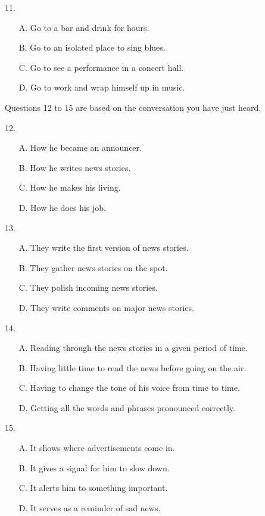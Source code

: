 \documentclass[UTF8,11pt]{ctexart}
\begin{document}
11.


\begin{itemize}[leftmargin=2em,itemsep=.2em,topsep=.4em]\item[A.] Go to a bar and drink for hours.
\item[B.] Go to an isolated place to sing blues.
\item[C.] Go to see a performance in a concert hall.
\item[D.] Go to work and wrap himself up in music.
\end{itemize}

Questions 12 to 15 are based on the conversation you have just heard.


12.


\begin{itemize}[leftmargin=2em,itemsep=.2em,topsep=.4em]\item[A.] How he became an announcer.
\item[B.] How he writes news stories.
\item[C.] How he makes his living.
\item[D.] How he does his job.
\end{itemize}

13.


\begin{itemize}[leftmargin=2em,itemsep=.2em,topsep=.4em]\item[A.] They write the first version of news stories.
\item[B.] They gather news stories on the spot.
\item[C.] They polish incoming news stories.
\item[D.] They write comments on major news stories.
\end{itemize}

14.


\begin{itemize}[leftmargin=2em,itemsep=.2em,topsep=.4em]\item[A.] Reading through the news stories in a given period of time.
\item[B.] Having little time to read the news before going on the air.
\item[C.] Having to change the tone of his voice from time to time.
\item[D.] Getting all the words and phrases pronounced correctly.
\end{itemize}

15.


\begin{itemize}[leftmargin=2em,itemsep=.2em,topsep=.4em]\item[A.] It shows where advertisements come in.
\item[B.] It gives a signal for him to slow down.
\item[C.] It alerts him to something important.
\item[D.] It serves as a reminder of sad news.
\end{itemize}
\end{document}
